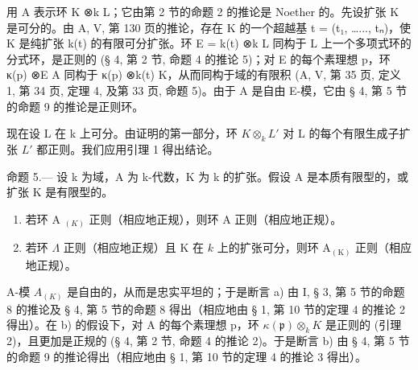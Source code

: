 用 A 表示环 K ⊗k L；它由第 2 节的命题 2 的推论是 Noether 的。先设扩张 K 是可分的。由 A, V, 第 130 页的推论，存在 K 的一个超越基 t = (t₁, \ldots..., tₙ)，使 K 是纯扩张 k(t) 的有限可分扩张。环 E = k(t) ⊗k L 同构于 L 上一个多项式环的分式环，是正则的 (§ 4, 第 2 节, 命题 4 的推论 5)；对 E 的每个素理想 p，环 κ(p) ⊗E A 同构于 κ(p) ⊗k(t) K，从而同构于域的有限积 (A, V, 第 35 页, 定义 1, 第 34 页, 定理 4, 及第 33 页, 命题 5)。由于 A 是自由 E-模，它由 § 4, 第 5 节的命题 9 的推论是正则环。

现在设 L 在 k 上可分。由证明的第一部分，环 \(K \otimes_{k} L'\) 对 L 的每个有限生成子扩张 \(L'\) 都正则。我们应用引理 1 得出结论。

命题 5.--- 设 k 为域，A 为 k-代数，K 为 k 的扩张。假设 A 是本质有限型的，或扩张 K 是有限型的。

\begin{enumerate}
\def\labelenumi{\alph{enumi})}
\item
  若环 A \(_{(K)}\) 正则（相应地正规），则环 A 正则（相应地正规）。
\item
  若环 \(\Lambda\) 正则（相应地正规）且 K 在 \(k\) 上的扩张可分，则环 \(\mathrm{A}_{(\mathrm{K})}\) 正则（相应地正规）。
\end{enumerate}

A-模 \(A_{(K)}\) 是自由的，从而是忠实平坦的；于是断言 a) 由 I, § 3, 第 5 节的命题 8 的推论及 § 4, 第 5 节的命题 8 得出（相应地由 § 1, 第 10 节的定理 4 的推论 2 得出）。在 b) 的假设下，对 A 的每个素理想 p，环 \(\kappa(\mathfrak{p})\otimes_{k}K\) 是正则的 (引理 2)，且更加是正规的 (§ 4, 第 2 节, 命题 4 的推论 2)。于是断言 b) 由 § 4, 第 5 节的命题 9 的推论得出（相应地由 § 1, 第 10 节的定理 4 的推论 3 得出）。
\relax{}
